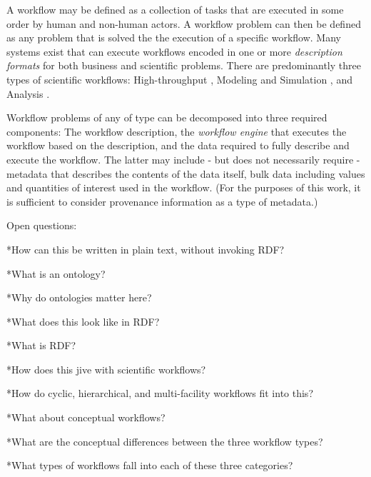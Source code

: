 A workflow may be defined as a collection of tasks that are executed in some order by human and non-human actors. A workflow problem can then be defined as any problem that is solved the the execution of a specific workflow. Many systems exist that can execute workflows encoded in one or more \textit{description formats} for both business and scientific problems. There are predominantly three types of scientific workflows: High-throughput \cite{}, Modeling and Simulation \cite{}, and Analysis \cite{}.

Workflow problems of any of type can be decomposed into three required components: The workflow description, the \textit{workflow engine} that executes the workflow based on the description, and the data required to fully describe and execute the workflow. The latter may include - but does not necessarily require - metadata that describes the contents of the data itself, bulk data including values and quantities of interest used in the workflow. (For the purposes of this work, it is sufficient to consider provenance information as a type of metadata.)

Open questions: 

*How can this be written in plain text, without invoking RDF?

*What is an ontology?

*Why do ontologies matter here?

*What does this look like in RDF?

*What is RDF?

*How does this jive with scientific workflows?

*How do cyclic, hierarchical, and multi-facility workflows fit into this?

*What about conceptual workflows?

*What are the conceptual differences between the three workflow types?

*What types of workflows fall into each of these three categories? 
